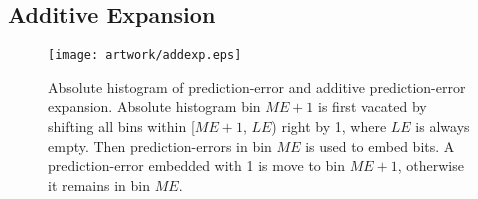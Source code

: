 \documentclass[journal]{IEEEtran}
\begin{document}
\subsection{Additive Expansion}\label{sub:ade}

\begin{figure}[t]
    \centering
    \texttt{[image: artwork/addexp.eps]}
    \caption{\label{fig:addexp} Absolute histogram of prediction-error and additive prediction-error
    expansion. Absolute histogram bin $\mathit{ME}+1$ is first vacated by shifting all bins within
    [$\mathit{ME}+1$, $\mathit{LE}$) right by 1, where $\mathit{LE}$ is always empty. Then
    prediction-errors in bin $\mathit{ME}$ is used to embed bits. A prediction-error embedded with 1
    is move to bin $\mathit{ME}+1$, otherwise it remains in bin $\mathit{ME}$. }
\end{figure}
\end{document}
